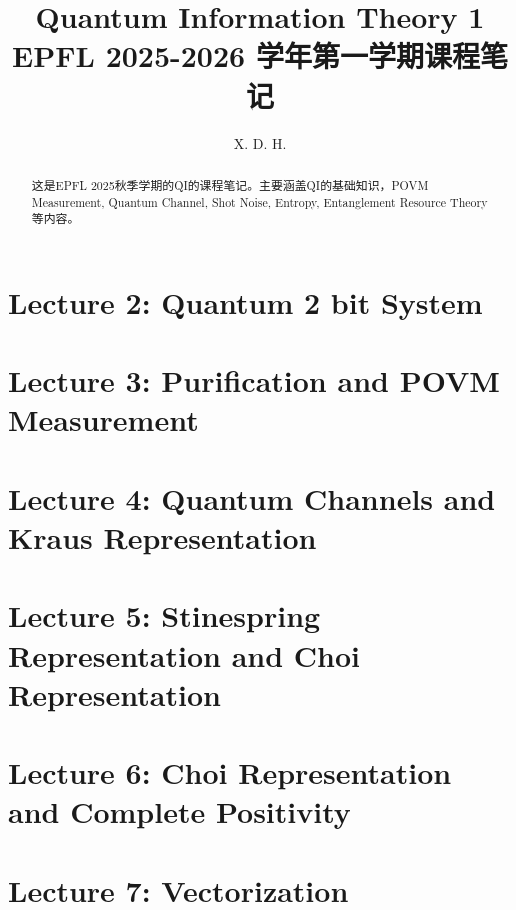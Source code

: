 \documentclass[10pt]{article}
\begin{document}
\title{\boldmath Quantum Information Theory 1 \\ \large EPFL
2025-2026 学年第一学期课程笔记}

\author{X. D. H.}

\maketitle

\begin{abstract}
  这是EPFL 2025秋季学期的QI的课程笔记。主要涵盖QI的基础知识，POVM Measurement, Quantum
  Channel, Shot Noise, Entropy, Entanglement Resource Theory等内容。
\end{abstract}

\tableofcontents
\newpage
\section{Lecture 2: Quantum 2 bit System}\label{sec:Lecture 2} %


\newpage
\section{Lecture 3: Purification and POVM Measurement
}\label{sec:Lecture 3} %


\newpage
\section{Lecture 4: Quantum Channels and Kraus
Representation}\label{sec:Lecture 4} %


\newpage
\section{Lecture 5: Stinespring Representation and Choi
Representation}\label{sec:Lecture 5} %


\newpage
\section{Lecture 6: Choi Representation and Complete
Positivity}\label{sec:Lecture 5} %


\newpage
\section{Lecture 7: Vectorization}\label{sec:Lecture 5} %

\end{document}
